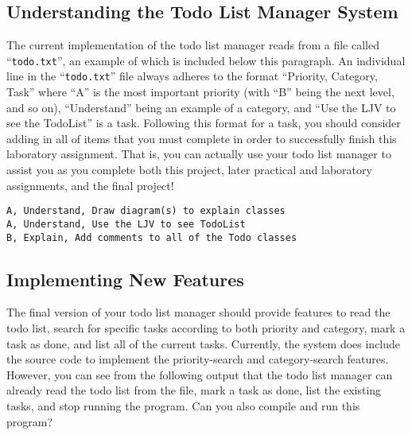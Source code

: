 \vspace{-0.1in}
\subsection*{Understanding the Todo List Manager System}
\vspace{-0.05in}

The current implementation of the todo list manager reads from a file called ``{\tt todo.txt}'', an example of which is
included below this paragraph. An individual line in the ``{\tt todo.txt}'' file always adheres to the format
``Priority, Category, Task'' where ``A'' is the most important priority (with ``B'' being the next level, and so on),
``Understand'' being an example of a category, and ``Use the LJV to see the TodoList'' is a task.  Following this format
for a task, you should consider adding in all of items that you must complete in order to successfully finish this
laboratory assignment. That is, you can actually use your todo list manager to assist you as you complete both this
project, later practical and laboratory assignments, and the final project!

\vspace{-0.05in}
\begin{verbatim}
A, Understand, Draw diagram(s) to explain classes
A, Understand, Use the LJV to see TodoList
B, Explain, Add comments to all of the Todo classes 
\end{verbatim}
\vspace{-0.05in}

\vspace{-0.15in}
\subsection*{Implementing New Features}
\vspace{-0.05in}

The final version of your todo list manager should provide features to read the todo list, search for specific tasks
according to both priority and category, mark a task as done, and list all of the current tasks.  Currently, the system
does include the source code to implement the priority-search and category-search features. However, you can see from
the following output that the todo list manager can already read the todo list from the file, mark a task as done, list
the existing tasks, and stop running the program. Can you also compile and run this program?

